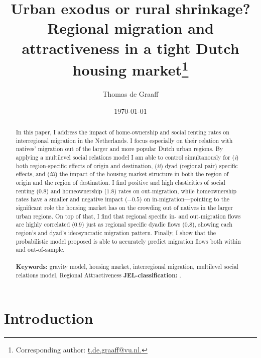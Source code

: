 \documentclass[11pt,parskip,abstracton,notitlepage, dvipsnames]{scrartcl}
\begin{document}
	\title{ Urban exodus or rural shrinkage? Regional migration and attractiveness in a tight Dutch housing market\thanks{Corresponding author: \url{t.de.graaff@vu.nl.}} }
	
	\author[1,2]{\small Thomas de Graaff}
	
	
	\date{\normalsize \today}
	\maketitle
	
	\begin{abstract}
		\noindent In this paper, I address the impact of home-ownership and social
		renting rates on interregional migration in the Netherlands. I focus
		especially on their relation with natives' migration out of the larger and
		more popular Dutch urban regions. By applying a multilevel social relations model I
		am able to control simultanously for (\emph{i}) both region-specific effects
		of origin and destination, (\emph{ii}) dyad (regional pair) specific effects,
		and (\emph{iii}) the impact of the housing market structure in both the region
		of origin and the region of destination. I find positive and high elasticities
		of social renting ($0.8$) and homeownership ($1.8$) rates on out-migration,
		while homeownership rates have a smaller and negative impact ($-0.5$) on
		in-migration---pointing to the significant role the housing market has on the
		crowding out of natives in the larger urban regions. On top of that, I find that regional
		specific in- and out-migration flows are highly correlated ($0.9$) just as
		regional specific dyadic flows ($0.8$), showing each region's and dyad's
		ideosyncratic migration pattern. Finally, I show that the probabilistic
		model proposed is able to accurately predict migration flows both within and out-of-sample. 
		\newline
		\\
		\\
		{\footnotesize \textbf{Keywords:} gravity model, housing market, interregional migration, multilevel social relations model, Regional Attractiveness
			\newline
			\textbf{JEL-classification:} .}
	\end{abstract}
	
	\newpage

\section{Introduction}\label{Introduction}
\end{document}
